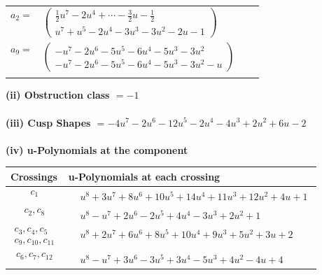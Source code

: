 \documentclass[1p]{elsarticle_modified}
\theoremstyle{definition}
\begin{document}
\begin{tabular}{m{7pt} m{180pt} m{7pt} m{180pt} }
\flushright $a_{2}=$&$\begin{pmatrix}\frac{1}{2} u^7-2 u^4+\cdots-\frac{3}{2} u-\frac{1}{2}\\u^7+u^5-2 u^4-3 u^3-3 u^2-2 u-1\end{pmatrix}$ \\
\flushright $a_{9}=$&$\begin{pmatrix}- u^7-2 u^6-5 u^5-6 u^4-5 u^3-3 u^2\\- u^7-2 u^6-5 u^5-6 u^4-5 u^3-3 u^2- u\end{pmatrix}$\\&\end{tabular}
\flushleft \textbf{(ii) Obstruction class $= -1$}\\~\\
\flushleft \textbf{(iii) Cusp Shapes $= -4 u^7-2 u^6-12 u^5-2 u^4-4 u^3+2 u^2+6 u-2$}\\~\\
\newpage\renewcommand{\arraystretch}{1}
\flushleft \textbf{(iv) u-Polynomials at the component}\newline \\
\begin{tabular}{m{50pt}|m{274pt}}
Crossings & \hspace{64pt}u-Polynomials at each crossing \\
\hline $$\begin{aligned}c_{1}\end{aligned}$$&$\begin{aligned}
&u^8+3 u^7+8 u^6+10 u^5+14 u^4+11 u^3+12 u^2+4 u+1
\end{aligned}$\\
\hline $$\begin{aligned}c_{2},c_{8}\end{aligned}$$&$\begin{aligned}
&u^8- u^7+2 u^6-2 u^5+4 u^4-3 u^3+2 u^2+1
\end{aligned}$\\
\hline $$\begin{aligned}c_{3},c_{4},c_{5}\\c_{9},c_{10},c_{11}\end{aligned}$$&$\begin{aligned}
&u^8+2 u^7+6 u^6+8 u^5+10 u^4+9 u^3+5 u^2+3 u+2
\end{aligned}$\\
\hline $$\begin{aligned}c_{6},c_{7},c_{12}\end{aligned}$$&$\begin{aligned}
&u^8- u^7+3 u^6-3 u^5+3 u^4-5 u^3+4 u^2-4 u+4
\end{aligned}$\\
\hline
\end{tabular}\\~\\
\end{document}
